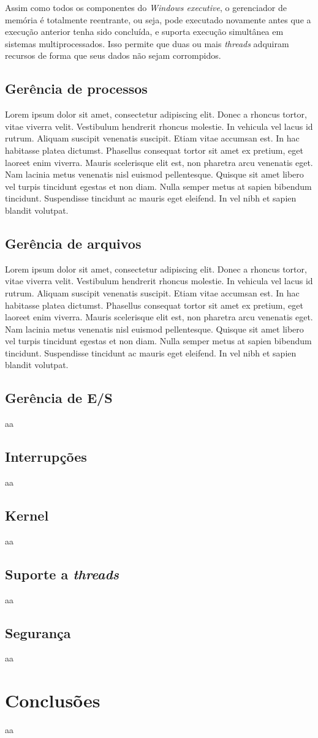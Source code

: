 \documentclass[journal]{IEEEtran}
\begin{document}
	Assim como todos os componentes do \emph{Windows executive}, o gerenciador de memória é totalmente reentrante, ou seja, pode executado novamente antes que a execução anterior tenha sido concluída, e suporta execução simultânea em sistemas multiprocessados. Isso permite que duas ou mais \emph{threads} adquiram recursos de forma que seus dados não sejam corrompidos.

\subsection{Gerência de processos}
	Lorem ipsum dolor sit amet, consectetur adipiscing elit. Donec a rhoncus tortor, vitae viverra velit. Vestibulum hendrerit rhoncus molestie. In vehicula vel lacus id rutrum. Aliquam suscipit venenatis suscipit. Etiam vitae accumsan est. In hac habitasse platea dictumst. Phasellus consequat tortor sit amet ex pretium, eget laoreet enim viverra. Mauris scelerisque elit est, non pharetra arcu venenatis eget. Nam lacinia metus venenatis nisl euismod pellentesque. Quisque sit amet libero vel turpis tincidunt egestas et non diam. Nulla semper metus at sapien bibendum tincidunt. Suspendisse tincidunt ac mauris eget eleifend. In vel nibh et sapien blandit volutpat. 

\subsection{Gerência de arquivos}
	Lorem ipsum dolor sit amet, consectetur adipiscing elit. Donec a rhoncus tortor, vitae viverra velit. Vestibulum hendrerit rhoncus molestie. In vehicula vel lacus id rutrum. Aliquam suscipit venenatis suscipit. Etiam vitae accumsan est. In hac habitasse platea dictumst. Phasellus consequat tortor sit amet ex pretium, eget laoreet enim viverra. Mauris scelerisque elit est, non pharetra arcu venenatis eget. Nam lacinia metus venenatis nisl euismod pellentesque. Quisque sit amet libero vel turpis tincidunt egestas et non diam. Nulla semper metus at sapien bibendum tincidunt. Suspendisse tincidunt ac mauris eget eleifend. In vel nibh et sapien blandit volutpat. 
	
\subsection{Gerência de E/S}
	aa
\subsection{Interrupções}
	aa
\subsection{Kernel}
	aa
\subsection{Suporte a \emph{threads}}
	aa
\subsection{Segurança}
	aa
\section{Conclusões}
	aa



	

\end{document}
